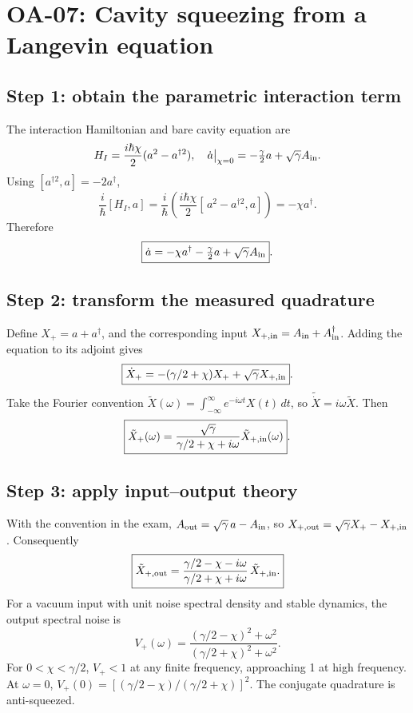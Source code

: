 
\section{OA-07: Cavity squeezing from a Langevin equation}
\subsection*{Step 1: obtain the parametric interaction term}
The interaction Hamiltonian and bare cavity equation are
\[
H_I=\frac{i\hbar\chi}{2}(a^2-a^{\dagger2}),\quad
\dot a\big|_{\chi=0}=-\tfrac\gamma2 a+\sqrt\gamma A_{\rm in}.
\]
Using \([a^{\dagger2},a]=-2a^\dagger\),
\[
\frac{i}{\hbar}[H_I,a]
=\frac{i}{\hbar}\left(\frac{i\hbar\chi}{2}
[\,a^2-a^{\dagger2},a]\right)
=-\chi a^\dagger.
\]
Therefore
\[
\boxed{\dot a=-\chi a^\dagger-\tfrac\gamma2a
+\sqrt\gamma A_{\rm in}}.
\]

\subsection*{Step 2: transform the measured quadrature}
Define \(X_+=a+a^\dagger\), and the corresponding
input \(X_{+,\rm in}=A_{\rm in}+A^\dagger_{\rm in}\).
Adding the equation to its adjoint gives
\[
\boxed{\dot X_+=-(\gamma/2+\chi)X_+
+\sqrt\gamma X_{+,\rm in}}.
\]
Take the Fourier convention
\(\tilde X(\omega)=\int_{-\infty}^\infty
e^{-i\omega t}X(t)\,dt\), so
\(\widetilde{\dot X}=i\omega\tilde X\).
Then
\[
\boxed{\tilde X_+(\omega)=
\frac{\sqrt\gamma}{\gamma/2+\chi+i\omega}
\tilde X_{+,\rm in}(\omega)}.
\]

\subsection*{Step 3: apply input--output theory}
With the convention in the exam,
\(A_{\rm out}=\sqrt\gamma\,a-A_{\rm in}\),
so \(X_{+,\rm out}=\sqrt\gamma X_+-X_{+,\rm in}\).
Consequently
\[
\boxed{\tilde X_{+,\rm out}=
\frac{\gamma/2-\chi-i\omega}
{\gamma/2+\chi+i\omega}\,
\tilde X_{+,\rm in}.}
\]
For a vacuum input with unit noise spectral density
and stable dynamics, the output spectral noise is
\[
\boxed{V_+(\omega)=
\frac{(\gamma/2-\chi)^2+\omega^2}
{(\gamma/2+\chi)^2+\omega^2}}.
\]
For \(0<\chi<\gamma/2\), \(V_+<1\) at any
finite frequency, approaching 1 at high frequency.
At \(\omega=0\),
\(V_+(0)=[(\gamma/2-\chi)/(\gamma/2+\chi)]^2\).
The conjugate quadrature is anti-squeezed.
